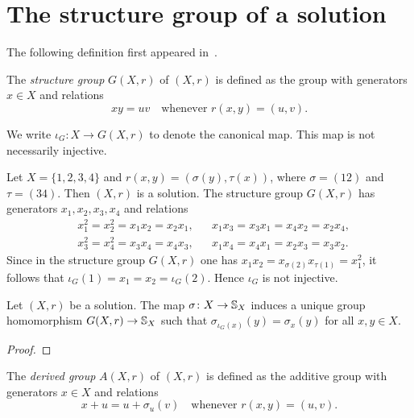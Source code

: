 \chapter{The structure group of a solution}

The following definition
first appeared in~\cite{MR1722951}. %

\begin{definition}
The \emph{structure group} $G(X,r)$ of $(X,r)$ is defined 
as the group with generators $x\in X$ and relations
\[
xy=uv\quad\text{whenever $r(x,y)=(u,v)$}.
\]
\end{definition}

We write $\iota_G\colon X\to G(X,r)$ to denote the canonical map. This map is not necessarily injective.

\begin{example}
    Let $X=\{1,2,3,4\}$ and $r(x,y)=(\sigma(y),\tau(x))$, where $\sigma=(12)$ and $\tau=(34)$. Then $(X,r)$ is a solution. 
    The structure group $G(X,r)$ has generators $x_1,x_2,x_3,x_4$ and relations
    \begin{align*}
        &x_1^2=x_2^2=x_1x_2=x_2x_1, 
        && x_1x_3=x_3x_1=x_4x_2=x_2x_4,\\
        & x_3^2=x_4^2=x_3x_4=x_4x_3,
        && x_1x_4=x_4x_1=x_2x_3=x_3x_2.
    \end{align*}
    Since in the structure group $G(X,r)$ one has $x_1x_2=x_{\sigma(2)}x_{\tau(1)}=x_1^2$, it follows that
    $\iota_G(1)=x_1=x_2=\iota_G(2)$. Hence $\iota_G$ is not injective.
\end{example}

\begin{lemma}
Let $(X,r)$ be a solution. 
The map $\sigma\colon X\to\mathbb{S}_X$ induces a unique group homomorphism 
$G(X,r)\to\mathbb{S}_X$ such that $\sigma_{\iota_G(x)}(y)=\sigma_x(y)$ for all $x,y\in X$. 
\end{lemma}

\begin{proof}

\end{proof}

\begin{definition}
The \emph{derived group} $A(X,r)$ of $(X,r)$ is defined 
as the additive group with generators $x\in X$ and relations
\[
x+u=u+\sigma_u(v)
\quad\text{whenever $r(x,y)=(u,v)$}.
\]
\end{definition}

